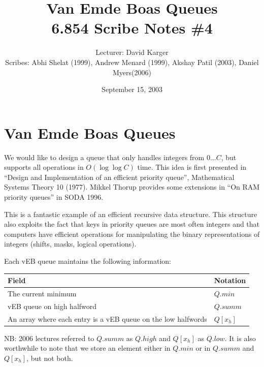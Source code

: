 \documentclass{article}[10pt]
\title{Van Emde Boas Queues\\ 6.854 Scribe Notes \#4}
\date{September 15, 2003}
\author{Lecturer: David Karger\\ Scribes: Abhi Shelat (1999), Andrew  Menard (1999), Akshay Patil (2003), Daniel Myers(2006)}
\begin{document}
%
%
%
%

%


\section{Van Emde Boas Queues}
We would like to design a queue that only handles integers from
$0...C$, but supports all operations in $O(\log \log C)$ time.
This idea is first presented in ``Design and Implementation of an efficient
priority queue'', Mathematical Systems Theory 10 (1977).  Mikkel Thorup
provides some extensions in ``On RAM priority queues'' in SODA 1996.

This is a fantastic example of an efficient recursive data structure.
This structure also exploits the fact that keys in priority queues are 
most often integers and that computers have efficient operations for
manipulating the binary representations of integers (shifts, masks, logical
operations).  

Each vEB queue maintains the following information:

\begin{center}
\begin{tabular}{ll} 
Field & Notation \\ \hline
The current minimum & $Q.min$ \\ 
vEB queue on high halfword & $Q.summ$ \\
An array where each entry is a vEB queue on the low halfwords & $Q[x_h]$ \\ 
\end{tabular}
\end{center}
NB: 2006 lectures referred to $Q.summ$ as $Q.high$ and $Q[x_h]$ as
$Q.low$. It is also worthwhile to note that we 
store an element either in $Q.min$ or in $Q.summ$ and $Q[x_h]$, but 
not both.
\end{document}
